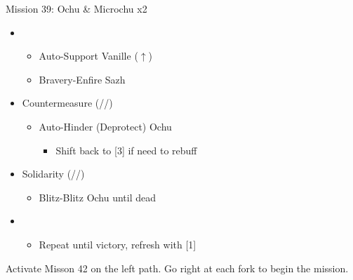 \renewcommand{\first}{[1] Solidarity (\com/\sen/\med)}
\renewcommand{\fifth}{[5] Countermeasure (\sab/\sen/\sab)}

\begin{battle}{Mission 39: Ochu \& Microchu x2}
	\begin{itemize}
		\item \third
			\begin{itemize}
				\item Auto-Support Vanille ($\uparrow$)
				\item Bravery-Enfire Sazh
			\end{itemize}
		\item \fifth
			\begin{itemize}
				\item Auto-Hinder (Deprotect) Ochu
					\begin{itemize}
						\item Shift back to [3] if need to rebuff
					\end{itemize}
			\end{itemize}
		\item \first
			\begin{itemize}
				\item Blitz-Blitz Ochu until dead
			\end{itemize}
		\item \second
			\begin{itemize}
				\item Repeat until victory, refresh with [1]
			\end{itemize}												
	\end{itemize}
\end{battle}

Activate Misson 42 on the left path.
Go right at each fork to begin the mission.

